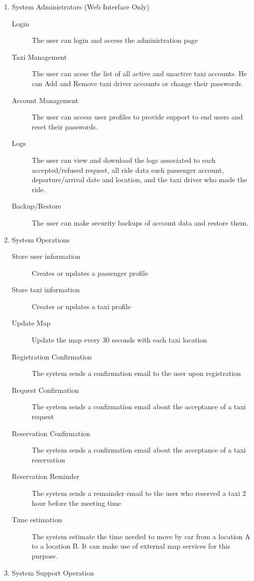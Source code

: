 \documentclass[11pt, a4paper,titlepage]{article}
\begin{document}
\begin{enumerate}
		\item System Administrators (Web Interface Only)  
			\begin{description}
				\item[Login] The user can login and access the administration page
				\item[Taxi Management] The user can acess the list of all active and unactive taxi accounts. He can Add and Remove taxi driver accounts or change their passwords.
				\item [Account Management] The user can access user profiles to provide support to end users and reset their passwords.
				\item[Logs] The user can view and download the logs associated to each accepted/refused request, all ride data such passenger account, departure/arrival date and location, and the taxi driver who made the ride.
				\item[Backup/Restore] The user can make security backups of account data and restore them.
			\end{description}
		
		\item System Operations
		\begin{description}
			\item[Store user information] Creates or updates a passenger profile
			\item[Store taxi information] Creates or updates a taxi profile
			\item[Update Map] Update the map every 30 seconds with each taxi location
			\item[Registration Confirmation] The system sends a confirmation email to the user upon registration
			\item[Request Confirmation] The system sends a confirmation email about the acceptance of a taxi request
			\item[Reservation Confirmation]  The system sends a confirmation email about the acceptance of a taxi reservation
			\item[Reservation Reminder] The system sends a remainder email to the user who reserved a taxi 2 hour before the meeting time
			\item[Time estimation] The system estimate the time needed to move by car from a location A to a location B. It can make use of external map services for this purpose.
		\end{description}
		
		\item System Support Operation
			
	\end{enumerate}
\end{document}
